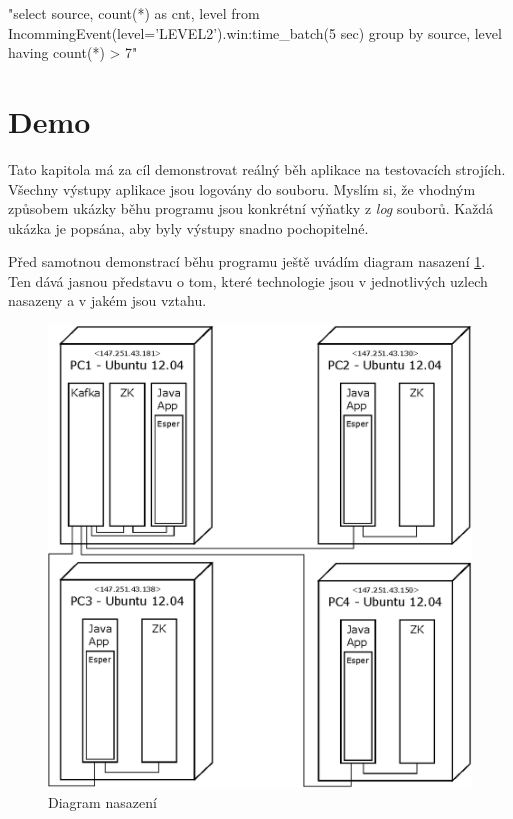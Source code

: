 \documentclass[
  digital, %
  table,   %
  nolof,     %
  nolot,     %
  oneside, %
  nocover,
  monochrome,
  12pt
]{fithesis3}
\begin{document}
\begin{center}
\begin{minipage}[H]{\linewidth}
	\begin{mylisting}
"select source, count(*) as cnt, level from
IncommingEvent(level='LEVEL2').win:time_batch(5 sec) group
by source, level having count(*) > 7"
	\end{mylisting}
	\label{fig:level_2_rule} 
\end{minipage}
\end{center}

\section{Demo}
\label{sec:demo}
Tato kapitola má za cíl demonstrovat reálný běh aplikace na testovacích strojích. Všechny výstupy aplikace jsou logovány do souboru. Myslím si, že vhodným způsobem ukázky běhu programu jsou konkrétní výňatky z \textit{log} souborů. Každá ukázka je popsána, aby byly výstupy snadno pochopitelné.

Před samotnou demonstrací běhu programu ještě uvádím diagram nasazení \ref{fig:deployment-diagram}. Ten dává jasnou představu o tom, které technologie jsou v jednotlivých uzlech nasazeny a v jakém jsou vztahu.

\begin{figure}[H]
	\centering
    \includegraphics[width=.75\linewidth, height=.5\textheight]{images/deployment-diagram.eps}
    \caption{Diagram nasazení}
    \label{fig:deployment-diagram}
\end{figure}
\end{document}

